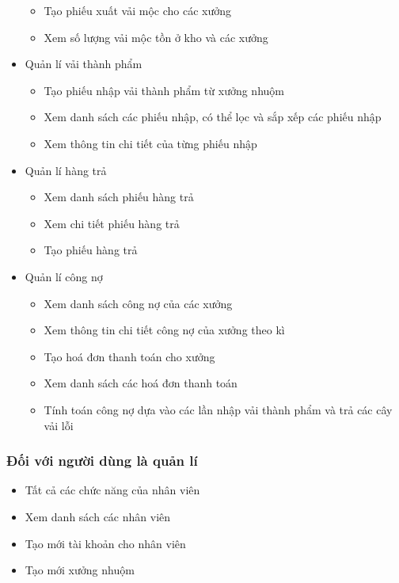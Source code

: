 \begin{itemize}
\begin{itemize}
        \item Tạo phiếu xuất vải mộc cho các xưởng
        \item Xem số lượng vải mộc tồn ở kho và các xưởng
    \end{itemize}
    \item Quản lí vải thành phẩm
    \begin{itemize}
        \item Tạo phiếu nhập vải thành phẩm từ xưởng nhuộm
        \item Xem danh sách các phiếu nhập, có thể lọc và sắp xếp các phiếu nhập
        \item Xem thông tin chi tiết của từng phiếu nhập
    \end{itemize}
    \item Quản lí hàng trả
    \begin{itemize}
        \item Xem danh sách phiếu hàng trả
        \item Xem chi tiết phiếu hàng trả
        \item Tạo phiếu hàng trả
    \end{itemize}
    \item Quản lí công nợ
    \begin{itemize}
        \item Xem danh sách công nợ của các xưởng
        \item Xem thông tin chi tiết công nợ của xưởng theo kì
        \item Tạo hoá đơn thanh toán cho xưởng 
        \item Xem danh sách các hoá đơn thanh toán
        \item Tính toán công nợ dựa vào các lần nhập vải thành phẩm và trả các cây vải lỗi
    \end{itemize}
\end{itemize}
\subsubsection{Đối với người dùng là quản lí}
\begin{itemize}
    \item Tất cả các chức năng của nhân viên
    \item Xem danh sách các nhân viên
    \item Tạo mới tài khoản cho nhân viên
    \item Tạo mới xưởng nhuộm
\end{itemize}
